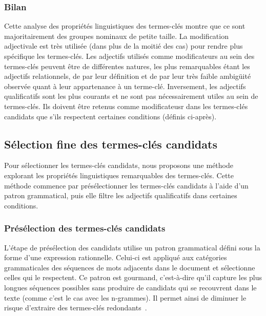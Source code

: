       \subsubsection{Bilan}
      \label{subsubsec:main:domain_independent_keyphrase_extraction-keyphrase_candidate_selection-analysis_of_keyphrase_properties-conclusion}
        Cette analyse des propriétés linguistiques des termes-clés montre que ce
        sont majoritairement des groupes nominaux de petite taille.
        La modification adjectivale est très utilisée (dans plus de la moitié
        des cas) pour rendre plus spécifique les termes-clés. Les adjectifs
        utilisés comme modificateurs au sein des termes-clés peuvent être de
        différentes natures, les plus remarquables étant les adjectifs
        relationnels, de par leur définition et de par leur très faible
        ambigüité observée quant à leur appartenance à un terme-clé.
        Inversement, les adjectifs qualificatifs sont les plus courants et ne
        sont pas nécessairement utiles au sein de termes-clés. Ils doivent être
        retenus comme modificateusr dans les termes-clés candidats que s'ils
        respectent certaines conditions (définis ci-après).

    \subsection{Sélection fine des termes-clés candidats}
    \label{subsec:main:domain_independent_keyphrase_extraction-keyphrase_candidate_selection-modifiers_filtering}
      Pour sélectionner les termes-clés candidats, nous proposons une méthode
      explorant les propriétés linguistiques remarquables des termes-clés. Cette
      méthode commence par présélectionner les termes-clés candidats à l'aide
      d'un patron grammatical, puis elle filtre les adjectifs qualificatifs dans
      certaines conditions.

      \subsubsection{Présélection des termes-clés candidats}
      \label{subsubsec:main:domain_independent_keyphrase_extraction-keyphrase_candidate_selection-modifiers_filtering-candidate_pre_selection}
        L'étape de présélection des candidats utilise un patron grammatical
        défini sous la forme d'une expression rationnelle. Celui-ci est appliqué
        aux catégories grammaticales des séquences de mots adjacents dans le
        document et sélectionne celles qui le respectent. Ce patron est
        gourmand, c'est-à-dire qu'il capture les plus longues séquences
        possibles sans produire de candidats qui se recouvrent dans le texte
        (comme c'est le cas avec les n-grammes). Il permet ainsi de diminuer le
        risque d'extraire des termes-clés
        redondants~\cite{hasan2014state_of_the_art}.

